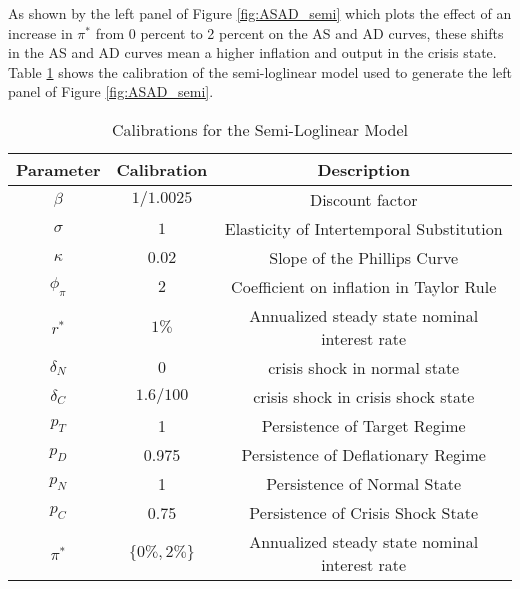 \documentclass[11pt]{article}
\begin{document}
\begin{singlespace}
		As shown by the left panel of Figure \ref{fig:ASAD_semi} which plots the effect of an increase in $\pi^*$ from 0 percent to 2 percent on the AS and AD curves, these shifts in the AS and AD curves mean a higher inflation and output in the crisis state. Table \ref{calib} shows the calibration of the semi-loglinear model used to generate the left panel of Figure \ref{fig:ASAD_semi}.
		\begin{table}
			\centering
			\caption{Calibrations for the Semi-Loglinear Model\label{calib}}
{\footnotesize
			\begin{tabular}{ccc}
				\hline
				\hline
				Parameter & Calibration & Description\\
				\hline
				$\beta$ & $1/1.0025$ & Discount factor \\
				$\sigma$ & $1$ & Elasticity of Intertemporal Substitution\\
				$\kappa$  & $0.02$ & Slope of the Phillips Curve \\
				$\phi_{\pi}$ & $2$ & Coefficient on inflation in Taylor Rule \\
				$r^*$ & $1\%$ & Annualized steady state nominal interest rate \\
				$\delta_N$ & $0$ & crisis shock in normal state \\
				$\delta_C$ & $1.6/100$ & crisis shock in crisis shock state \\
				\hline
				$p_T$ & 1 & Persistence of Target Regime \\
				$p_D$ & 0.975 & Persistence of Deflationary Regime \\
				$p_{N}$ & 1 & Persistence of Normal State \\
				$p_C$ & 0.75 & Persistence of Crisis Shock State \\
				\hline
				$\pi^*$ & $\{0\%, 2\%\}$ & Annualized steady state nominal interest rate \\
				\hline
				\hline
			\end{tabular}
}		\end{table}


\end{singlespace}
\end{document}
